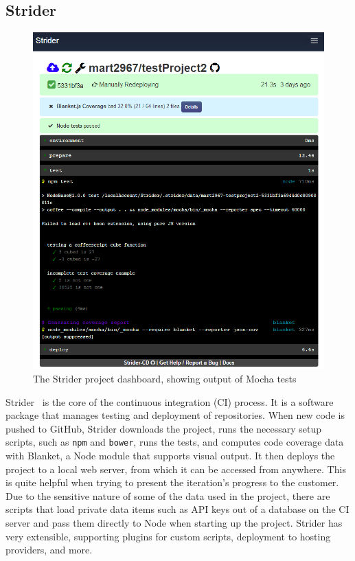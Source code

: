 \documentclass[12pt]{article}
\newcommand{\code}[1]{{\texttt {#1}}}
\begin{document}
\subsection{Strider}\label{sec:strider}
\begin{figure}[h!]
\includegraphics[width=\linewidth]{img/strider_2.png}
\caption{The Strider project dashboard, showing output of Mocha tests}
\end{figure}
Strider~\cite{Strider} is the core of the continuous integration (CI) process. 
It is a software package that manages testing and deployment of repositories. 
When new code is pushed to GitHub, Strider downloads the project, runs the necessary setup scripts, such as \code{npm} and \code{bower}, runs the tests, and computes code coverage data with Blanket, a Node module that supports visual output. 
It then deploys the project to a local web server, from which it can be accessed from anywhere. 
This is quite helpful when trying to present the iteration's progress to the customer. 
Due to the sensitive nature of some of the data used in the project, there are scripts that load private data items such as API keys out of a database on the CI server and pass them directly to Node when starting up the project. 
Strider has very extensible, supporting plugins for custom scripts, deployment to hosting providers, and more.
\end{document}
